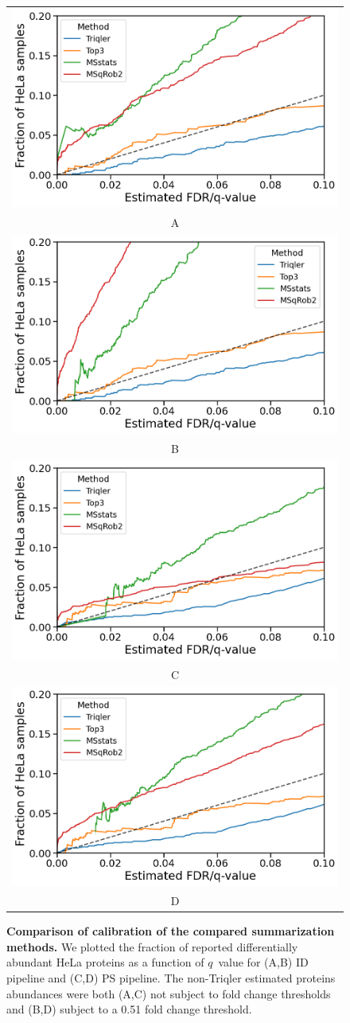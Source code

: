 \documentclass[11pt]{article}
\begin{document}
\begin{figure}[hbt]
    \centering
    \centering
    \begin{tabular}{c} 
        \includegraphics[width=0.5\linewidth]{../../result/report_plots_pipeline/calibration_ID_0.png} \\
        A \\ 
        \includegraphics[width=0.5\linewidth]{../../result/report_plots_pipeline/calibration_ID_0.51.png} \\
        B \\
        \includegraphics[width=0.5\linewidth]{../../result/report_plots_pipeline/calibration_PS_0.png} \\
        C \\
        \includegraphics[width=0.5\linewidth]{../../result/report_plots_pipeline/calibration_PS_0.51.png} \\
        D 
    \end{tabular}
  \caption{{\bf Comparison of calibration of the compared summarization methods.} We plotted the fraction of reported differentially abundant HeLa proteins as a function of $q$~value for (A,B) ID pipeline and (C,D) PS pipeline. The non-Triqler estimated proteins abundances were both (A,C) not subject to fold change thresholds and (B,D) subject to a 0.51 fold change threshold. \label{fig:frac_hela_vs_fdr_supp}}
\end{figure}
\end{document}
